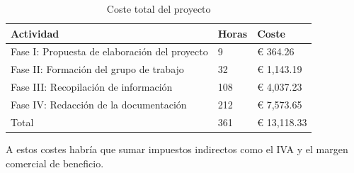 \begin{table}[H]
    \centering
    \begin{tabular}{lll}
        \toprule
        Actividad                                       & Horas & Coste       \\
        \midrule
        Fase I: Propuesta de elaboración del   proyecto & 9     & € 364.26    \\
        Fase II: Formación del grupo de trabajo         & 32    & € 1,143.19  \\
        Fase III: Recopilación de información           & 108   & € 4,037.23  \\
        Fase IV: Redacción de la documentación          & 212   & € 7,573.65  \\
        \midrule
        Total                                           & 361   & € 13,118.33 \\
        \bottomrule
    \end{tabular}
    \caption{Coste total del proyecto}
    \label{tab:coste-total}
\end{table}

A estos costes habría que sumar impuestos indirectos como el IVA y el margen comercial de beneficio.